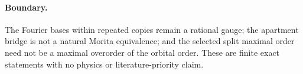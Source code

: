 \paragraph{Boundary.}
The Fourier bases within repeated copies remain a rational gauge; the apartment
bridge is not a natural Morita equivalence; and the selected split maximal order
need not be a maximal overorder of the orbital order.  These are finite exact
statements with no physics or literature-priority claim.
